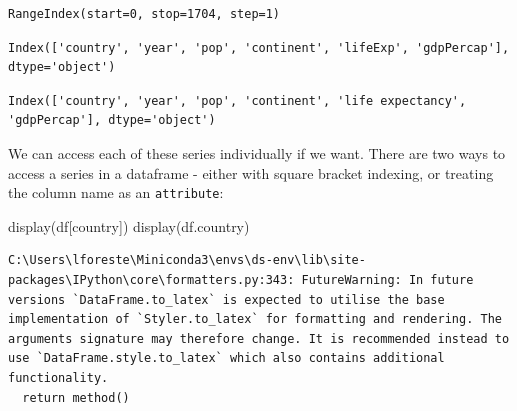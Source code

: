 \documentclass[
  letterpaper,
  DIV=11,
  numbers=noendperiod]{scrreprt}
\newenvironment{Shaded}{\begin{snugshade}}{\end{snugshade}}
\newcommand{\NormalTok}[1]{\textcolor[rgb]{0.00,0.23,0.31}{#1}}
\newcommand{\StringTok}[1]{\textcolor[rgb]{0.13,0.47,0.30}{#1}}
\begin{document}
\begin{verbatim}
RangeIndex(start=0, stop=1704, step=1)
\end{verbatim}

\begin{verbatim}
Index(['country', 'year', 'pop', 'continent', 'lifeExp', 'gdpPercap'], dtype='object')
\end{verbatim}

\begin{verbatim}
Index(['country', 'year', 'pop', 'continent', 'life expectancy', 'gdpPercap'], dtype='object')
\end{verbatim}

We can access each of these series individually if we want. There are
two ways to access a series in a dataframe - either with square bracket
indexing, or treating the column name as an \texttt{attribute}:

\begin{Shaded}
\begin{Highlighting}[]
\NormalTok{display(df[}\StringTok{\textquotesingle{}country\textquotesingle{}}\NormalTok{])}
\NormalTok{display(df.country)}
\end{Highlighting}
\end{Shaded}

\begin{verbatim}
C:\Users\lforeste\Miniconda3\envs\ds-env\lib\site-packages\IPython\core\formatters.py:343: FutureWarning: In future versions `DataFrame.to_latex` is expected to utilise the base implementation of `Styler.to_latex` for formatting and rendering. The arguments signature may therefore change. It is recommended instead to use `DataFrame.style.to_latex` which also contains additional functionality.
  return method()
\end{verbatim}
\end{document}
